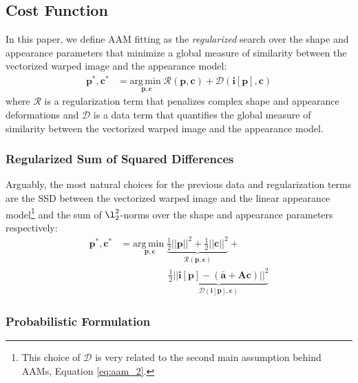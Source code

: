 \subsection{Cost Function}
\label{sec:cost_function}

In this paper, we define AAM fitting as the \emph{regularized} search over the shape and appearance parameters that minimize a global measure of similarity between the vectorized warped image and the appearance model:
\begin{equation}
    \begin{aligned}
        \mathbf{p}^*, \mathbf{c}^* & = \underset{\mathbf{p}, \mathbf{c}} {\mathrm{arg\, min\;}} \mathcal{R} (\mathbf{p}, \mathbf{c}) + \mathcal{D} (\mathbf{i}[\mathbf{p}], \mathbf{c}) 
        \end{aligned}
    \label{eq:aam_fitting}
\end{equation}
where $\mathcal{R}$ is a regularization term that penalizes complex shape and appearance deformations and $\mathcal{D}$ is a data term that
quantifies the global measure of similarity between the vectorized warped image and the appearance model.

\subsubsection{Regularized Sum of Squared Differences}
\label{sec:rssd}

Arguably, the most natural choices for the previous data and regularization terms are the SSD between the vectorized warped image and the linear appearance model\footnote{This choice of $\mathcal{D}$ is very related to the second main assumption behind AAMs, Equation \ref{eq:aam_2}.} and the sum of $\l_2^2$-norms over the shape and appearance parameters respectively:
\begin{equation}
    \begin{aligned}
        \mathbf{p}^*, \mathbf{c}^* & = \underset{\mathbf{p}, \mathbf{c}} {\mathrm{arg\, min\;}} \underbrace{\frac{1}{2}||\mathbf{p}||^2 + \frac{1}{2}||\mathbf{c}||^2}_{\mathcal{R} (\mathbf{p}, \mathbf{c})} +
        \\
        & \qquad \qquad \quad \underbrace{\frac{1}{2}|| \mathbf{i}[\mathbf{p}] - (\mathbf{\bar{a}} + \mathbf{A} \mathbf{c}) ||^2}_{\mathcal{D} (\mathbf{i}[\mathbf{p}], \mathbf{c})}
    \end{aligned}
    \label{eq:rssd}
\end{equation}
\subsubsection*{Probabilistic Formulation}
\label{sec:rssd_pi}

